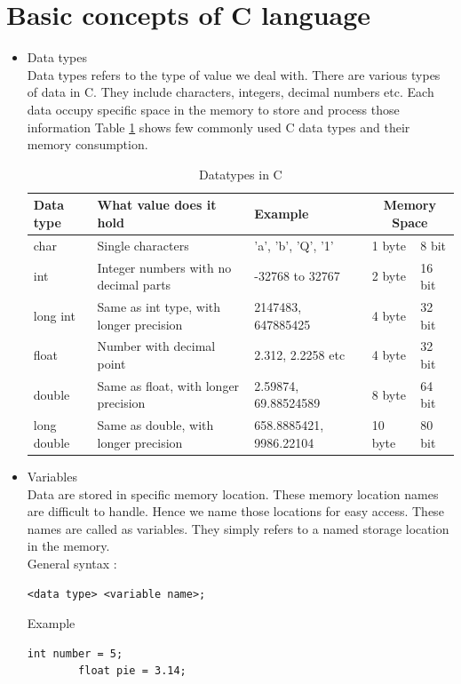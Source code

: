 \section{Basic concepts of C language}
\begin{itemize}
    \item Data types \\
    Data types refers to the type of value we deal with. There are various types of data in C. They include characters, integers, decimal numbers etc. Each data occupy specific space in the memory to store and process those information Table \ref{tab:datatypes} shows few commonly used C data types and their memory consumption.
    
    \renewcommand{\arraystretch}{2}
    \begin{table}
    \centering
    \begin{tabular}{|l|l|l|l|l|}
    \hline
        Data type & What value does it hold & Example & \multicolumn{2}{c|}{Memory Space} \\ \hline
        char & Single characters & 'a', 'b', 'Q', '1' & 1 byte & 8 bit \\ \hline
        int & Integer numbers with no decimal parts & -32768 to 32767 & 2 byte & 16 bit \\ \hline
        long int & Same as int type, with longer precision & 2147483, 647885425 & 4 byte & 32 bit \\ \hline
        float & Number with decimal point & 2.312, 2.2258 etc & 4 byte & 32 bit \\ \hline
        double & Same as float, with longer precision & 2.59874, 69.88524589 & 8 byte & 64 bit \\ \hline
        long double & Same as double, with longer precision & 658.8885421, 9986.22104 & 10 byte & 80 bit \\ \hline
    \end{tabular}
    \label{datatypes}
    \vspace{5mm}
    \caption{Datatypes in C}
    \label{tab:datatypes}
\end{table}
\renewcommand{\arraystretch}{1}

    \item Variables \\
    Data are stored in specific memory location. These memory location names are difficult to handle. Hence we name those locations for easy access. These names are called as variables. They simply refers to a named storage location in the memory.\\
    General syntax : 
    \begin{lstlisting}[style=CStyle]
        <data type> <variable name>;
    \end{lstlisting}
    Example
    \begin{lstlisting}[style=CStyle]
        int number = 5;
        float pie = 3.14;
    \end{lstlisting}
    

\end{itemize}
